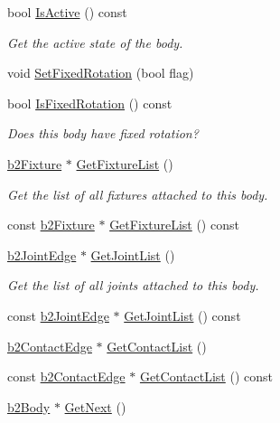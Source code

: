 \begin{DoxyCompactItemize}
bool \mbox{\hyperlink{classb2_body_a825f37f457d3674ace96e2b8a9b4cae6}{Is\+Active}} () const
\begin{DoxyCompactList}\small\item\em Get the active state of the body. \end{DoxyCompactList}\item 
void \mbox{\hyperlink{classb2_body_aff35078e2a221d2d05409674936cb8d2}{Set\+Fixed\+Rotation}} (bool flag)
\item 
bool \mbox{\hyperlink{classb2_body_a0920b7a770f7c876cf6d149e227036b5}{Is\+Fixed\+Rotation}} () const
\begin{DoxyCompactList}\small\item\em Does this body have fixed rotation? \end{DoxyCompactList}\item 
\mbox{\hyperlink{classb2_fixture}{b2\+Fixture}} $\ast$ \mbox{\hyperlink{classb2_body_a64634da20c6e0ab2d68a3cc9ea15efc3}{Get\+Fixture\+List}} ()
\begin{DoxyCompactList}\small\item\em Get the list of all fixtures attached to this body. \end{DoxyCompactList}\item 
const \mbox{\hyperlink{classb2_fixture}{b2\+Fixture}} $\ast$ \mbox{\hyperlink{classb2_body_ae232293cb940477443434c5e846607e3}{Get\+Fixture\+List}} () const
\item 
\mbox{\hyperlink{structb2_joint_edge}{b2\+Joint\+Edge}} $\ast$ \mbox{\hyperlink{classb2_body_a55cf2eb851780599ca5c1f6f25a17e41}{Get\+Joint\+List}} ()
\begin{DoxyCompactList}\small\item\em Get the list of all joints attached to this body. \end{DoxyCompactList}\item 
const \mbox{\hyperlink{structb2_joint_edge}{b2\+Joint\+Edge}} $\ast$ \mbox{\hyperlink{classb2_body_a3e581c94ae0fbc4e1083bf6ed8c0f0a9}{Get\+Joint\+List}} () const
\item 
\mbox{\hyperlink{structb2_contact_edge}{b2\+Contact\+Edge}} $\ast$ \mbox{\hyperlink{classb2_body_a16bdbfb266c82a0ef51be351a8928bc5}{Get\+Contact\+List}} ()
\item 
const \mbox{\hyperlink{structb2_contact_edge}{b2\+Contact\+Edge}} $\ast$ \mbox{\hyperlink{classb2_body_a137168690469fb838ab89c5f27a7cf43}{Get\+Contact\+List}} () const
\item 
\mbox{\hyperlink{classb2_body}{b2\+Body}} $\ast$ \mbox{\hyperlink{classb2_body_ad54182a11d02362b027a0eb072775bdc}{Get\+Next}} ()

\end{DoxyCompactItemize}
